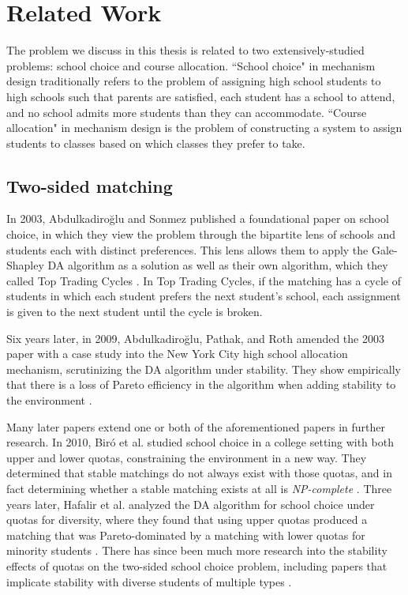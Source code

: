 \section{Related Work}

The problem we discuss in this thesis is related to two extensively-studied
problems: school choice and course allocation. ``School choice" in mechanism design
traditionally refers to the problem of assigning high school students to high schools such that
parents are satisfied, each student has a school to attend, and no school admits
more students than they can accommodate. ``Course allocation" in mechanism design
is the problem of constructing a system to assign students to classes based on
which classes they prefer to take.

\subsection{Two-sided matching}

In 2003, Abdulkadiroğlu and Sonmez published a foundational paper on school choice,
in which they view the problem through the bipartite lens of schools and
students each with distinct preferences.  This lens allows them to apply the
Gale-Shapley DA algorithm as a solution as well as their own algorithm, which
they called Top Trading Cycles \cite{school-choice}. In Top Trading
Cycles, if the matching has a cycle of students in which each student prefers
the next student’s school, each assignment is given to the next student until
the cycle is broken.

Six years later, in 2009, Abdulkadiroğlu, Pathak, and Roth amended the 2003
paper with a case study into the New York City high school allocation mechanism,
scrutinizing the DA algorithm under stability. They show
empirically that there is a loss of Pareto efficiency in the algorithm when
adding stability to the environment \cite{abu-2009}.

Many later papers extend one or
both of the aforementioned papers in further research. In 2010, Biró et al.
studied school choice in a college setting with both upper and lower quotas,
constraining the environment in a new way. They determined that stable matchings
do not always exist with those quotas, and in fact determining whether a stable
matching exists at all is \textit{NP-complete} \cite{quotas}. Three years later, Hafalir
et al. analyzed the DA algorithm for school choice under quotas for diversity,
where they found that using upper quotas produced a matching that was
Pareto-dominated by a matching with lower quotas for minority students
\cite{affirmative-action}. There has since been much more research into the
stability effects of quotas on the two-sided school choice problem, including
papers that implicate stability with diverse students of multiple types
\cite{kurata}.

